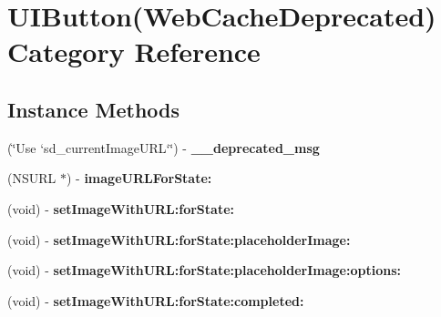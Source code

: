 \hypertarget{category_u_i_button_07_web_cache_deprecated_08}{}\section{U\+I\+Button(Web\+Cache\+Deprecated) Category Reference}
\label{category_u_i_button_07_web_cache_deprecated_08}
\subsection*{Instance Methods}
\begin{DoxyCompactItemize}
\item 
\hypertarget{category_u_i_button_07_web_cache_deprecated_08_a9abef11d7c09d7ab93a5e9bf531e3311}{}(\char`\"{}Use `sd\+\_\+current\+Image\+U\+R\+L`\char`\"{}) -\/ {\bfseries \+\_\+\+\_\+deprecated\+\_\+msg}\label{category_u_i_button_07_web_cache_deprecated_08_a9abef11d7c09d7ab93a5e9bf531e3311}

\item 
\hypertarget{category_u_i_button_07_web_cache_deprecated_08_a305d73f802a6434249974d65be3d9750}{}(N\+S\+U\+R\+L $\ast$) -\/ {\bfseries image\+U\+R\+L\+For\+State\+:}\label{category_u_i_button_07_web_cache_deprecated_08_a305d73f802a6434249974d65be3d9750}

\item 
\hypertarget{category_u_i_button_07_web_cache_deprecated_08_aeca373829b5f51180a13f865cd87cb3b}{}(void) -\/ {\bfseries set\+Image\+With\+U\+R\+L\+:for\+State\+:}\label{category_u_i_button_07_web_cache_deprecated_08_aeca373829b5f51180a13f865cd87cb3b}

\item 
\hypertarget{category_u_i_button_07_web_cache_deprecated_08_a35ca2800c35d658b6912441428d947d3}{}(void) -\/ {\bfseries set\+Image\+With\+U\+R\+L\+:for\+State\+:placeholder\+Image\+:}\label{category_u_i_button_07_web_cache_deprecated_08_a35ca2800c35d658b6912441428d947d3}

\item 
\hypertarget{category_u_i_button_07_web_cache_deprecated_08_a78e5f27bcab0e7630e3101deabfeaaf9}{}(void) -\/ {\bfseries set\+Image\+With\+U\+R\+L\+:for\+State\+:placeholder\+Image\+:options\+:}\label{category_u_i_button_07_web_cache_deprecated_08_a78e5f27bcab0e7630e3101deabfeaaf9}

\item 
\hypertarget{category_u_i_button_07_web_cache_deprecated_08_acfe64bd1eda02bbd92c987c1d038533b}{}(void) -\/ {\bfseries set\+Image\+With\+U\+R\+L\+:for\+State\+:completed\+:}\label{category_u_i_button_07_web_cache_deprecated_08_acfe64bd1eda02bbd92c987c1d038533b}


\end{DoxyCompactItemize}
